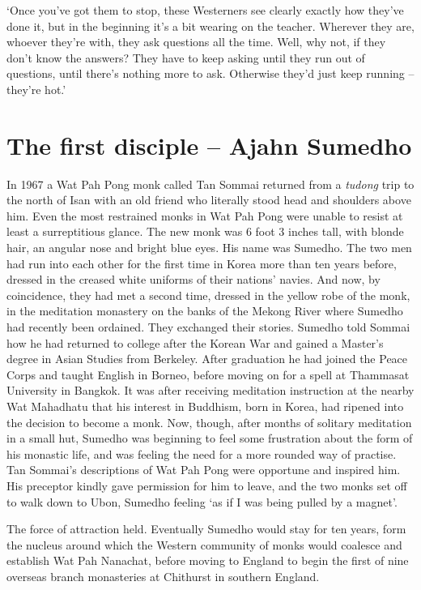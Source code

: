 `Once you've got them to stop, these Westerners see clearly exactly how
they've done it, but in the beginning it's a bit wearing on the teacher. 
Wherever they are, whoever they're with, they ask questions all the
time. Well, why not, if they don't know the answers? They have to keep
asking until they run out of questions, until there's nothing more to
ask. Otherwise they'd just keep running -- they're hot.'

\section{The first disciple -- Ajahn Sumedho}

In 1967 a Wat Pah Pong monk called Tan Sommai returned from a
\emph{tudong} trip to the north of Isan with an old friend who literally
stood head and shoulders above him. Even the most restrained monks in
Wat Pah Pong were unable to resist at least a surreptitious glance. The
new monk was 6 foot 3 inches tall, with blonde hair, an angular nose and
bright blue eyes. His name was Sumedho. The two men had run into each
other for the first time in Korea more than ten years before, dressed in
the creased white uniforms of their nations' navies. And now, by
coincidence, they had met a second time, dressed in the yellow robe of
the monk, in the meditation monastery on the banks of the Mekong River
where Sumedho had recently been ordained. They exchanged their stories. 
Sumedho told Sommai how he had returned to college after the Korean War
and gained a Master's degree in Asian Studies from Berkeley. After
graduation he had joined the Peace Corps and taught English in Borneo, 
before moving on for a spell at Thammasat University in Bangkok. It was
after receiving meditation instruction at the nearby Wat Mahadhatu that
his interest in Buddhism, born in Korea, had ripened into the decision
to become a monk. Now, though, after months of solitary meditation in a
small hut, Sumedho was beginning to feel some frustration about the form
of his monastic life, and was feeling the need for a more rounded way of
practise. Tan Sommai's descriptions of Wat Pah Pong were opportune and
inspired him. His preceptor kindly gave permission for him to leave, and
the two monks set off to walk down to Ubon, Sumedho feeling `as if I was
being pulled by a magnet'. 

The force of attraction held. Eventually Sumedho would stay for ten
years, form the nucleus around which the Western community of monks
would coalesce and establish Wat Pah Nanachat, before moving to
England to begin the first of nine overseas branch monasteries at
Chithurst in southern England. 

